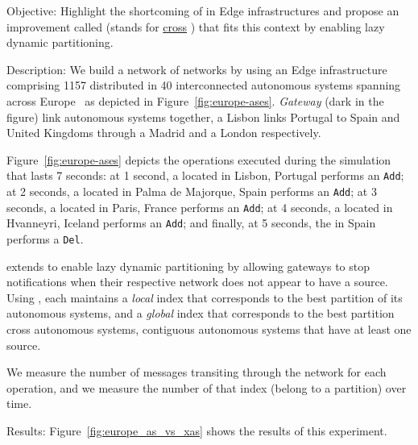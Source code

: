 \begin{asparadesc}
  \item[Objective:] Highlight the shortcoming of \NAME in Edge
    infrastructures and propose an improvement called \NAMEC (stands
    for \underline{cross} \underline{\NAME}) that fits this context by
    enabling lazy dynamic partitioning.
    
  \item[Description:] We build a network of networks by using an Edge
    infrastructure comprising 1157 \processes distributed in 40
    interconnected autonomous systems spanning across
    Europe~\cite{knight2011internet} as depicted in
    Figure~\ref{fig:europe-ases}. \emph{Gateway} \processes (dark in
    the figure) link autonomous systems together, \eg a Lisbon \node
    links Portugal to Spain and United Kingdoms through a Madrid \node
    and a London \node respectively.

    \noindent Figure~\ref{fig:europe-ases} depicts the operations executed
    during the simulation that lasts 7 seconds: at 1 second, a \node
    located in Lisbon, Portugal performs an \texttt{Add}; at 2
    seconds, a \node located in Palma de Majorque, Spain performs an
    \texttt{Add}; at 3 seconds, a \node located in Paris, France
    performs an \texttt{Add}; at 4 seconds, a \node located in
    Hvanneyri, Iceland performs an \texttt{Add}; and finally, at 5
    seconds, the \node in Spain performs a \texttt{Del}.
    
    \noindent \NAMEC extends \NAME to enable lazy dynamic partitioning
    by allowing gateways to stop notifications when their respective
    network does not appear to have a source. Using \NAMEC, each
    \process maintains a \emph{local} index that corresponds to the
    best partition of its autonomous systems, and a \emph{global}
    index that corresponds to the best partition cross autonomous
    systems, \ie contiguous autonomous systems that have at least one
    source.
    
    \noindent We measure the number of messages transiting through the
    network for each operation, and we measure the number of
    \processes that index (\ie belong to a partition) over time.
    
  \item[Results:] Figure~\ref{fig:europe_as_vs_xas} shows the results
    of this experiment.
\end{asparadesc}


